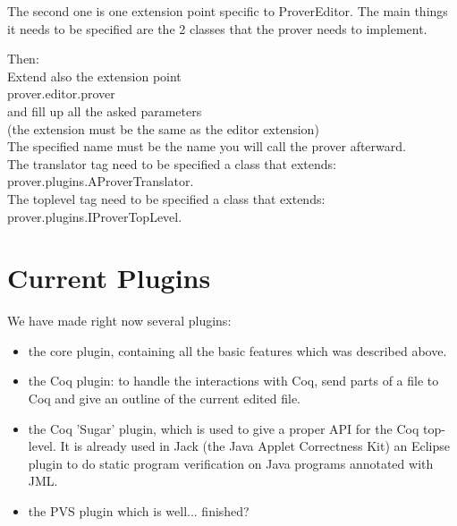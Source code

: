\documentclass{llncs}
\begin{document}
The second one is one extension point specific to ProverEditor.
The main things it needs to be specified are the 2 classes that the prover
needs to implement.

Then:\\
Extend also the extension point\\
prover.editor.prover\\
and fill up all the asked parameters\\
(the extension must be the same as the editor extension)\\
The specified name must be the name you will call the prover afterward.\\
The translator tag need to be specified a class that extends:\\
prover.plugins.AProverTranslator.\\
The toplevel tag need to be specified a class that extends:\\
prover.plugins.IProverTopLevel.\\



\section{Current Plugins}
\label{sec:current-plugins}

We have made right now several plugins:
\begin{itemize}
\item the core plugin, containing all the basic features which was 
described above.
\item the Coq plugin: to handle the interactions with Coq, send parts of a 
file to Coq
and give an outline of the current edited file.
\item the Coq 'Sugar' plugin, which is used to give a proper API for the 
Coq top-level.
It is already used in Jack \cite{Jack-Web} (the Java Applet Correctness Kit) 
an Eclipse plugin to do static program verification on Java programs 
annotated with JML.

\item the PVS plugin which is well... finished?
\end{itemize}
\end{document}
